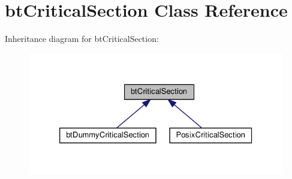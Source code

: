 \hypertarget{classbtCriticalSection}{}\section{bt\+Critical\+Section Class Reference}
\label{classbtCriticalSection}


Inheritance diagram for bt\+Critical\+Section\+:
\nopagebreak
\begin{figure}[H]
\begin{center}
\leavevmode
\includegraphics[width=326pt]{classbtCriticalSection__inherit__graph}
\end{center}
\end{figure}
